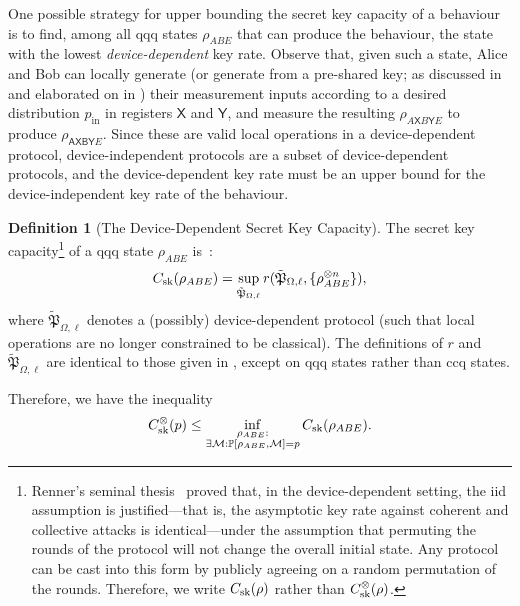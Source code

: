 \documentclass[10pt, a4paper]{article}
\numberwithin{equation}{section} %
\newcounter{stmt} %
\theoremstyle{definition}
\newtheorem{defn}[stmt]{Definition}
\theoremstyle{plain}
\newcommand{\?}{\mathrel{?}} %
\newcommand{\sM}{\mathcal{M}}
\newcommand{\crv}[1]{\mathsf{#1}}
\newcommand{\qproto}[2][_{\Omega,\ell}]{\tilde{\mathfrak{#2}}#1}
\newcommand{\prin}[1][p]{#1_{\mathrm{in}}}
\newcommand{\behav}[2]{\mathbb{P}\left[#1, #2\right]}
\newcommand{\sk}{\rm sk}
\begin{document}
    One possible strategy for upper bounding the secret key capacity of a behaviour is to find, among all qqq states \(\rho_{ABE}\) that can produce the behaviour, the state with the lowest \emph{device-dependent} key rate. Observe that, given such a state, Alice and Bob can locally generate (or generate from a pre-shared key; as discussed in  and elaborated on in ) their measurement inputs according to a desired distribution \(\prin\) in registers \(\crv{X}\) and \(\crv{Y}\), and measure the resulting \(\rho_{A\crv{X}B\crv{Y}E}\) to produce \(\rho_{\crv{AXBY}E}\). Since these are valid local operations in a device-dependent protocol, device-independent protocols are a subset of device-dependent protocols, and the device-dependent key rate must be an upper bound for the device-independent key rate of the behaviour.

    \begin{defn}[The Device-Dependent Secret Key Capacity]\label{def:seckeycapstate}
    The secret key capacity\footnote{Renner's seminal thesis~\cite{RennerQKD} proved that, in the device-dependent setting, the iid assumption is justified---that is, the asymptotic key rate against coherent and collective attacks is identical---under the assumption that permuting the rounds of the protocol will not change the overall initial state. Any protocol can be cast into this form by publicly agreeing on a random permutation of the rounds. Therefore, we write \(C_{\sk}(\rho)\) rather than \(C^{\otimes}_{\sk}(\rho)\).} of a qqq state \(\rho_{ABE}\) is~\cite{CQKeyDistill}:
    \begin{equation}
      C_{\sk}(\rho_{A B E}) = \sup_{\qproto{P}} r(\qproto{P}, \{\rho_{ABE}^{\otimes n}\}),
    \end{equation}
    where \(\qproto{P}\) denotes a (possibly) device-dependent protocol (such that local operations are no longer constrained to be classical). The definitions of \(r\) and \(\qproto{P}\) are identical to those given in , except on qqq states rather than ccq states.
  \end{defn}

    Therefore, we have the inequality
    \begin{equation}
      C^{\otimes}_{\sk}(p) \leq \inf_{ 
        \substack{\rho_{A B E} : \\ 
      \exists \sM : \behav{\rho_{A B E}}{ \sM} = p}
      } C_{\sk}(\rho_{A B E}).
    \end{equation}
\end{document}
